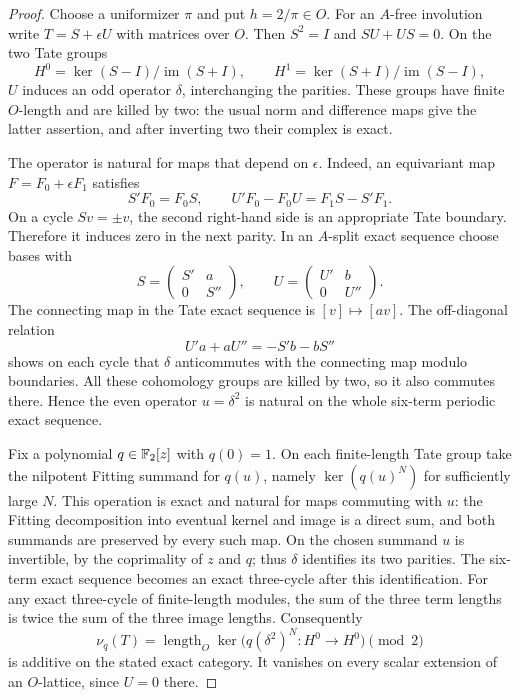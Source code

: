 \begin{proof}
Choose a uniformizer $\pi$ and put $h=2/\pi\in O$.
For an $A$-free involution write $T=S+\epsilon U$ with matrices over
$O$.  Then $S^2=I$ and $SU+US=0$.  On the two Tate groups
\[
 H^0=\ker(S-I)/\operatorname{im}(S+I),\qquad
 H^1=\ker(S+I)/\operatorname{im}(S-I),
\]
$U$ induces an odd operator $\delta$, interchanging the parities.
These groups have finite $O$-length and are killed by two: the usual
norm and difference maps give the latter assertion, and after
inverting two their complex is exact.

The operator is natural for maps that depend on $\epsilon$.
Indeed, an equivariant map $F=F_0+\epsilon F_1$ satisfies
\[
 S'F_0=F_0S,\qquad U'F_0-F_0U=F_1S-S'F_1.
\]
On a cycle $Sv=\pm v$, the second right-hand side is an appropriate
Tate boundary.  Therefore it induces zero in the next parity.
In an $A$-split exact sequence choose bases with
\[
 S=\begin{pmatrix}S'&a\\0&S''\end{pmatrix},\qquad
 U=\begin{pmatrix}U'&b\\0&U''\end{pmatrix}.
\]
The connecting map in the Tate exact sequence is $[v]\mapsto[av]$.
The off-diagonal relation
\[
 U'a+aU''=-S'b-bS''
\]
shows on each cycle that $\delta$ anticommutes with the connecting map
modulo boundaries.  All these cohomology groups are killed by two,
so it also commutes there.  Hence the even operator $u=\delta^2$ is
natural on the whole six-term periodic exact sequence.

Fix a polynomial $q\in\mathbb F_2[z]$ with $q(0)=1$.
On each finite-length Tate group take the nilpotent Fitting summand
for $q(u)$, namely $\ker(q(u)^N)$ for sufficiently large $N$.
This operation is exact and natural for maps commuting with $u$:
the Fitting decomposition into eventual kernel and image is a direct
sum, and both summands are preserved by every such map.  On the
chosen summand $u$ is invertible, by the coprimality of $z$ and $q$;
thus $\delta$ identifies its two parities.  The six-term exact
sequence becomes an exact three-cycle after this identification.
For any exact three-cycle of finite-length modules, the sum of the
three term lengths is twice the sum of the three image lengths.
Consequently
\[
 \nu_q(T)=\operatorname{length}_O
       \ker\bigl(q(\delta^2)^N:H^0\longrightarrow H^0\bigr)\pmod2
\]
is additive on the stated exact category.  It vanishes on every
scalar extension of an $O$-lattice, since $U=0$ there.


\end{proof}

